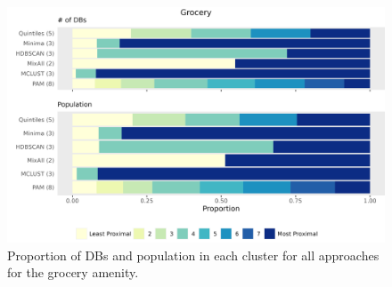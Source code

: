 \documentclass[11pt, a4paper]{article}
\begin{document}
\begin{figure}[H]
\centering
\includegraphics[width=\textwidth]{./barplot_comparison/Grocery_barplot.png}
\caption[Grocery profile barplot]{Proportion of DBs and population in each cluster for all approaches for the grocery amenity.}\label{grocerybarplot}
\end{figure}




\centering
\begin{table}[H]
\centering
\caption[Grocery validation metrics]{The validation metric values for each clustering approach for the grocery amenity.}\label{groceryvalid}
\end{table}
\end{document}

